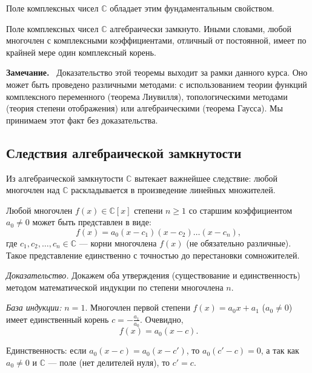 \documentclass[a4paper,12pt]{article}
\newcommand{\myremark}{\textbf{Замечание.}\ }
\theoremstyle{definition}
\theoremstyle{plain}
\theoremstyle{remark}
\begin{document}
	\medskip
	Поле комплексных чисел \( \mathbb{C} \) обладает этим фундаментальным свойством.
	
	\begin{tcolorbox}[colback=red!5, colframe=red!50!black, title=Теорема (Основная теорема алгебры)]
		Поле комплексных чисел \( \mathbb{C} \) алгебраически замкнуто. Иными словами, любой многочлен с комплексными коэффициентами, отличный от постоянной, имеет по крайней мере один комплексный корень.
	\end{tcolorbox}
	
	\myremark
	Доказательство этой теоремы выходит за рамки данного курса. Оно может быть проведено различными методами: с использованием теории функций комплексного переменного (теорема Лиувилля), топологическими методами (теория степени отображения) или алгебраическими (теорема Гаусса). Мы принимаем этот факт без доказательства.
	
	\subsection{Следствия алгебраической замкнутости}
	
	Из алгебраической замкнутости \( \mathbb{C} \) вытекает важнейшее следствие: любой многочлен над \( \mathbb{C} \) раскладывается в произведение линейных множителей.
	
	\begin{tcolorbox}[colback=blue!5, colframe=blue!40!black, title=Теорема (Разложение на линейные множители)]
		Любой многочлен \( f(x) \in \mathbb{C}[x] \) степени \( n \geq 1 \) со старшим коэффициентом \( a_0 \neq 0 \) может быть представлен в виде:
		\[
		f(x) = a_0 (x - c_1)(x - c_2) \dots (x - c_n),
		\]
		где \( c_1, c_2, \dots, c_n \in \mathbb{C} \) — корни многочлена \( f(x) \) (не обязательно различные). Такое представление единственно с точностью до перестановки сомножителей.
	\end{tcolorbox}
	
	\medskip
	\textit{Доказательство.}
	Докажем оба утверждения (существование и единственность) методом математической индукции по степени многочлена \( n \).
	
	\textit{База индукции:} \( n = 1 \). Многочлен первой степени \( f(x) = a_0 x + a_1 \) (\( a_0 \neq 0 \)) имеет единственный корень \( c = -\frac{a_1}{a_0} \). Очевидно,
	\[
	f(x) = a_0 (x - c).
	\]
	
	Единственность: если \( a_0 (x - c) = a_0 (x - c') \), то \( a_0 (c' - c) = 0 \), а так как \( a_0 \neq 0 \) и \( \mathbb{C} \) — поле (нет делителей нуля), то \( c' = c \).
	
\end{document}
